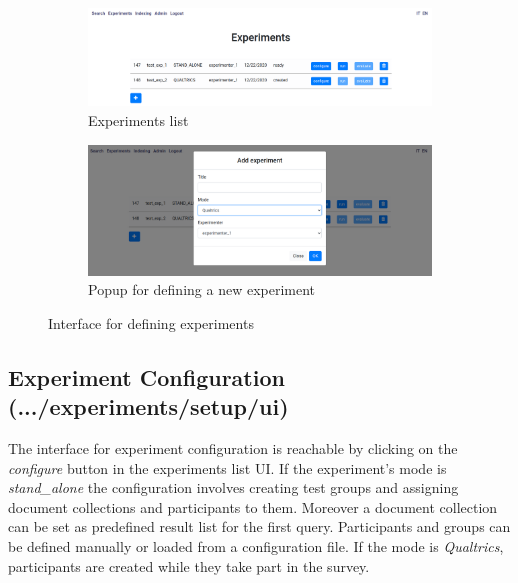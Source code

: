 \documentclass[fleqn]{article}
\begin{document}
\begin{figure} [h]
     \centering
     \begin{subfigure}[b]{0.8\textwidth}
         \centering
         \includegraphics[width=\textwidth]{img/experiments_1}
         \caption{Experiments list}
         \label{fig:experimentsUi1}
     \end{subfigure}
     \par\bigskip
     \begin{subfigure}[b]{0.8\textwidth}
         \centering
         \includegraphics[width=\textwidth]{img/experiments_2}
         \caption{Popup for defining a new experiment}
         \label{fig:experimentsUi2}
     \end{subfigure}
     \caption{Interface for defining experiments}
     \label{fig:experimentsUi}
\end{figure}


\subsection{Experiment Configuration \small{(.../experiments/setup/ui)}}

The interface for experiment configuration is reachable by clicking on the \emph{configure} button in the
experiments list UI. If the experiment's mode is \emph{stand\_alone} the configuration involves creating test groups and assigning 
document collections and participants to them. Moreover a document collection can be set as predefined result list for the first query.
Participants and groups can be defined manually or loaded from a configuration file. If the mode is \emph{Qualtrics}, participants are created while
they take part in the survey.
\end{document}
